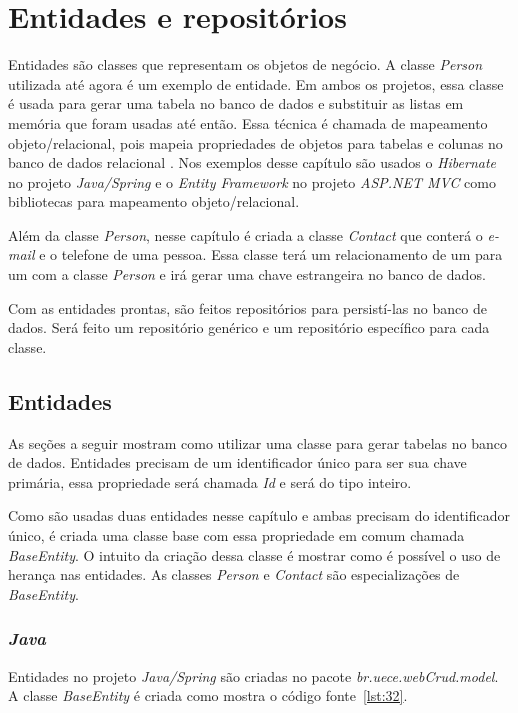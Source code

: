 \chapter{Entidades e repositórios}

Entidades são classes que representam os objetos de negócio. A classe \textit{Person} utilizada até agora é um exemplo de entidade. Em ambos os projetos, essa classe é usada para gerar uma tabela no banco de dados e substituir as listas em memória que foram usadas até então. Essa técnica é chamada de mapeamento objeto/relacional, pois mapeia propriedades de objetos para tabelas e colunas no banco de dados relacional \cite{13}. Nos exemplos desse capítulo são usados o \textit{Hibernate} no projeto \textit{Java/Spring} e o \textit{Entity Framework} no projeto \textit{ASP.NET MVC} como bibliotecas para mapeamento objeto/relacional.

Além da classe \textit{Person}, nesse capítulo é criada a classe \textit{Contact} que conterá o \textit{e-mail} e o telefone de uma pessoa. Essa classe terá um relacionamento de um para um com a classe \textit{Person} e irá gerar uma chave estrangeira no banco de dados.

Com as entidades prontas, são feitos repositórios para persistí-las no banco de dados. Será feito um repositório genérico e um repositório específico para cada classe.

\section{Entidades}

As seções a seguir mostram como utilizar uma classe para gerar tabelas no banco de dados. Entidades precisam de um identificador único para ser sua chave primária, essa propriedade será chamada \textit{Id} e será do tipo inteiro.

Como são usadas duas entidades nesse capítulo e ambas precisam do identificador único, é criada uma classe base com essa propriedade em comum chamada \textit{BaseEntity}. O intuito da criação dessa classe é mostrar como é possível o uso de herança nas entidades. As classes \textit{Person} e \textit{Contact} são especializações de \textit{BaseEntity}.

\subsection{\textit{Java}}

Entidades no projeto \textit{Java/Spring} são criadas no pacote \textit{br.uece.webCrud.model}. A classe \textit{BaseEntity} é criada como mostra o código fonte~\ref{lst:32}.

